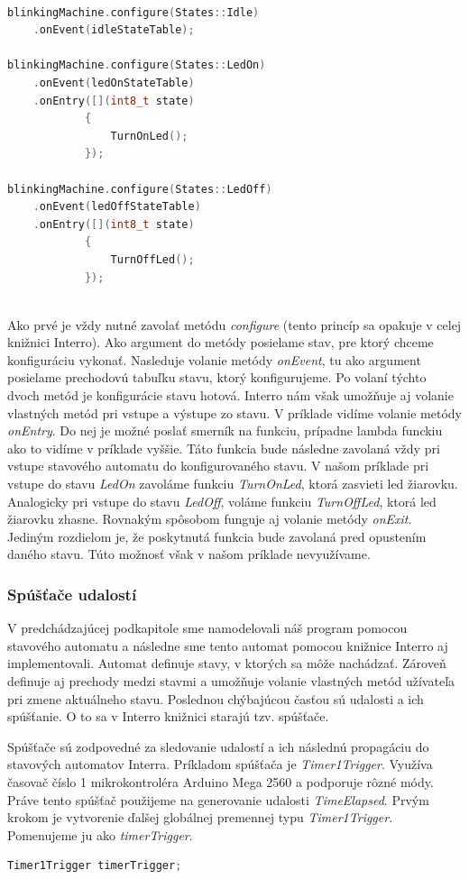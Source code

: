\begin{lstlisting}[language=c++]  

blinkingMachine.configure(States::Idle)
    .onEvent(idleStateTable);

blinkingMachine.configure(States::LedOn)
    .onEvent(ledOnStateTable)
    .onEntry([](int8_t state)
            {
                TurnOnLed();
            });

blinkingMachine.configure(States::LedOff)
    .onEvent(ledOffStateTable)
    .onEntry([](int8_t state)
            { 
                TurnOffLed();
            });
        
    \end{lstlisting}

Ako prvé je vždy nutné zavolať metódu \textit{configure} (tento princíp sa opakuje v celej knižnici Interro).
Ako argument do metódy posielame stav, pre ktorý chceme konfiguráciu vykonať. Nasleduje volanie metódy \textit{onEvent}, tu ako argument posielame prechodovú tabuľku
stavu, ktorý konfigurujeme. Po volaní týchto dvoch metód je konfigurácie stavu hotová. Interro nám však umožňuje aj volanie vlastných metód pri vstupe a
výstupe zo stavu. V príklade vidíme volanie metódy  \textit{onEntry}. Do nej je možné poslať smerník na funkciu, prípadne lambda funckiu ako to vidíme
v príklade vyššie. Táto funkcia bude následne zavolaná vždy pri vstupe stavového automatu do konfigurovaného stavu. V našom príklade pri vstupe do stavu
\textit{LedOn} zavoláme funkciu \textit{TurnOnLed}, ktorá zasvieti led žiarovku. Analogicky pri vstupe do stavu \textit{LedOff}, voláme funkciu \textit{TurnOffLed},
ktorá led žiarovku zhasne. Rovnakým spôsobom funguje aj volanie metódy
\textit{onExit}. Jediným rozdielom je, že poskytnutá funkcia bude zavolaná pred opustením daného stavu. Túto možnosť však v našom príklade nevyužívame.

\subsubsection{Spúšťače udalostí}
\noindent \par
V predchádzajúcej podkapitole sme namodelovali náš program pomocou stavového automatu a následne sme tento automat pomocou knižnice Interro aj implementovali.
Automat definuje stavy, v ktorých sa môže nachádzať. Zároveň definuje aj prechody medzi stavmi a umožňuje volanie vlastných metód užívateľa pri zmene aktuálneho stavu.
Poslednou chýbajúcou časťou sú udalosti a ich spúšťanie. O to sa v Interro knižnici starajú tzv. spúšťače. \par
Spúšťače sú zodpovedné za sledovanie udalostí a ich následnú propagáciu do stavových automatov Interra.
Príkladom spúšťača je \textit{Timer1Trigger}. Využíva časovač číslo 1 mikrokontroléra Arduino Mega 2560 a podporuje rôzné módy.
Práve tento spúšťač použijeme na generovanie udalosti \textit{TimeElapsed}. Prvým krokom je vytvorenie ďalšej globálnej premennej typu \textit{Timer1Trigger}.
Pomenujeme ju ako \textit{timerTrigger}.
\begin{lstlisting}[language=c++]  
Timer1Trigger timerTrigger;            
\end{lstlisting}

